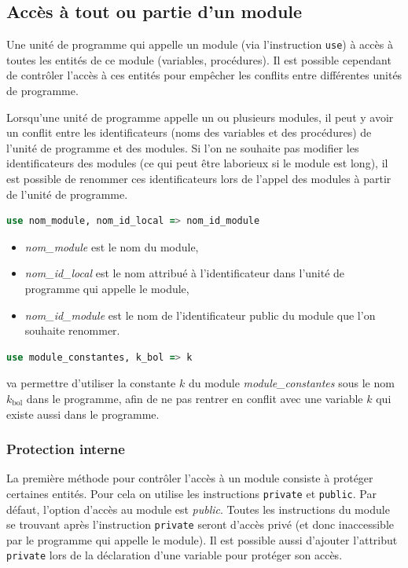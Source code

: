 \documentclass[a4paper,twoside]{article}
\begin{document}
\subsection{Accès à tout ou partie d'un module}

Une unité de programme qui appelle un module (via l'instruction \texttt{use}) à accès à toutes les entités de ce module (variables, procédures). Il est possible cependant de contrôler l'accès à ces entités pour empêcher les conflits entre différentes unités de programme.

\bigskip

\begin{attention}
Lorsqu'une unité de programme appelle un ou plusieurs modules, il peut y avoir un conflit entre les identificateurs (noms des variables et des procédures) de l'unité de programme et des modules. Si l'on ne souhaite pas modifier les identificateurs des modules (ce qui peut être laborieux si le module est long), il est possible de renommer ces identificateurs lors de l'appel des modules à partir de l'unité de programme.
\begin{lstlisting}[language=Fortran]
use nom_module, nom_id_local => nom_id_module
\end{lstlisting}

\begin{itemize}
\item \emph{nom\_module} est le nom du module,
\item \emph{nom\_id\_local} est le nom attribué à l'identificateur 
dans l'unité de programme qui appelle le module,
\item \emph{nom\_id\_module} est le nom de l'identificateur public du 
module que l'on souhaite renommer.
\end{itemize}
\end{attention}


\begin{exemple}
\begin{lstlisting}[language=Fortran]
use module_constantes, k_bol => k
\end{lstlisting}
va permettre d'utiliser la constante $k$ du module \emph{module\_constantes} sous le nom $k_\text{bol}$ dans le programme, afin de ne pas rentrer en conflit avec une variable $k$ qui existe aussi dans le programme.
\end{exemple}


\subsubsection{Protection interne}
La première méthode pour contrôler l'accès à un module consiste à protéger certaines entités. Pour cela on utilise les instructions \texttt{private} et \texttt{public}. Par défaut, l'option d'accès au module est \emph{public}. Toutes les instructions du module se trouvant après l'instruction \texttt{private} seront d'accès privé (et donc inaccessible par le programme qui appelle le module). Il est possible aussi d'ajouter l'attribut \texttt{private} lors de la déclaration d'une variable pour protéger son accès.
\end{document}
